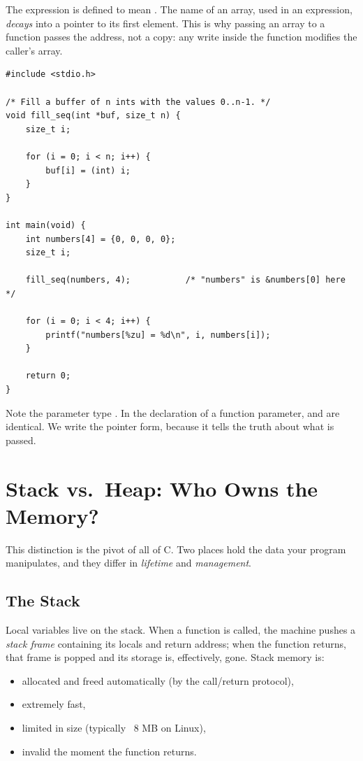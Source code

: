 The expression  is defined to mean
. The name of an array, used in an expression,
\emph{decays} into a pointer to its first element. This is why
passing an array to a function passes the address, not a copy: any
write inside the function modifies the caller's array.

\begin{lstlisting}[caption={Arrays decay to pointers when passed to functions.}]
#include <stdio.h>

/* Fill a buffer of n ints with the values 0..n-1. */
void fill_seq(int *buf, size_t n) {
    size_t i;

    for (i = 0; i < n; i++) {
        buf[i] = (int) i;
    }
}

int main(void) {
    int numbers[4] = {0, 0, 0, 0};
    size_t i;

    fill_seq(numbers, 4);           /* "numbers" is &numbers[0] here */

    for (i = 0; i < 4; i++) {
        printf("numbers[%zu] = %d\n", i, numbers[i]);
    }

    return 0;
}
\end{lstlisting}

Note the parameter type . In the declaration of a
function parameter,  and  are identical.
We write the pointer form, because it tells the truth about what is
passed.

\section{Stack vs.\ Heap: Who Owns the Memory?}

This distinction is the pivot of all of C. Two places hold the data
your program manipulates, and they differ in \emph{lifetime} and
\emph{management}.

\subsection{The Stack}

Local variables live on the stack. When a function is called, the
machine pushes a \emph{stack frame} containing its locals and return
address; when the function returns, that frame is popped and its
storage is, effectively, gone. Stack memory is:

\begin{itemize}
  \item allocated and freed automatically (by the call/return protocol),
  \item extremely fast,
  \item limited in size (typically ~8 MB on Linux),
  \item invalid the moment the function returns.
\end{itemize}

